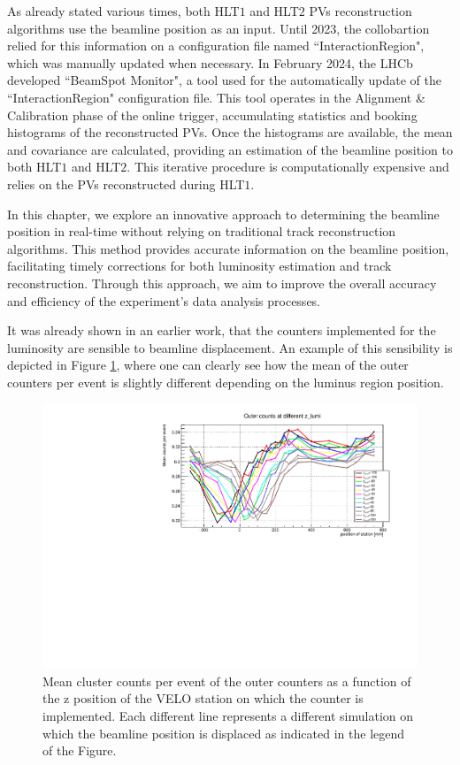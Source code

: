 As already stated various times, both HLT$1$ and HLT$2$ PVs reconstruction algorithms use the beamline position as an input. Until 2023, the collobartion relied for this information on a configuration file named ``InteractionRegion", which was manually updated when necessary. In February 2024, the LHCb developed ``BeamSpot Monitor", a tool used for the automatically update of the ``InteractionRegion" configuration file.  This tool operates in the Alignment \& Calibration phase of the online trigger, accumulating statistics and booking histograms of the reconstructed PVs. Once the histograms are available, the mean and covariance are calculated, providing an estimation of the beamline position to both HLT$1$ and HLT$2$. This iterative procedure is computationally expensive and relies on the PVs reconstructed during HLT$1$.

In this chapter, we explore an innovative approach to determining the beamline position in real-time without relying on traditional track reconstruction algorithms. This method provides accurate information on the beamline position, facilitating timely corrections for both luminosity estimation and track reconstruction. Through this approach, we aim to improve the overall accuracy and efficiency of the experiment's data analysis processes.

It was already shown in an earlier work\cite{dan}, that the counters implemented for the luminosity are sensible to beamline displacement. An example of this sensibility is depicted in Figure \ref{fig:z_lumi_dependency}, where one can clearly see how the mean of the outer counters per event is slightly different depending on the luminus region position. 

\begin{figure}
    \centering
    \includegraphics[width=\textwidth]{figures/z_lumi_dependency.pdf}
    \caption{Mean cluster counts per event of the outer counters as a function of the z position of the VELO station on which the counter is implemented. Each different line represents a different simulation on which the beamline position is displaced as indicated in the legend of the Figure.}
    \label{fig:z_lumi_dependency}
\end{figure}

